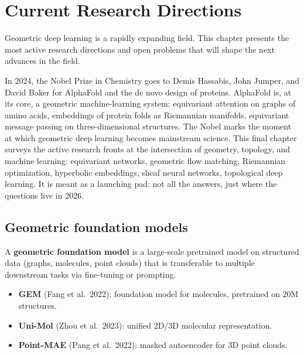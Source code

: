 \chapter{Current Research Directions}
\label{ch:research}

\begin{intuition}
Geometric deep learning is a rapidly expanding field. This chapter
presents the most active research directions and open problems that
will shape the next advances in the field.
\end{intuition}

In 2024, the Nobel Prize in Chemistry goes to Demis Hassabis, John Jumper, and David Baker for AlphaFold and the de novo design of proteins. AlphaFold is, at its core, a geometric machine-learning system: equivariant attention on graphs of amino acids, embeddings of protein folds as Riemannian manifolds, equivariant message passing on three-dimensional structures. The Nobel marks the moment at which geometric deep learning becomes mainstream science. This final chapter surveys the active research fronts at the intersection of geometry, topology, and machine learning: equivariant networks, geometric flow matching, Riemannian optimization, hyperbolic embeddings, sheaf neural networks, topological deep learning. It is meant as a launching pad: not all the answers, just where the questions live in 2026.

\section{Geometric foundation models}
\label{sec:foundation_models}

\begin{definition}
A \textbf{geometric foundation model} is a large-scale pretrained
model on structured data (graphs, molecules, point clouds) that is
transferable to multiple downstream tasks via fine-tuning or
prompting.
\end{definition}

\begin{example}
\begin{itemize}
  \item \textbf{GEM} (Fang et al.\ 2022): foundation model for
        molecules, pretrained on 20M structures.
  \item \textbf{Uni-Mol} (Zhou et al.\ 2023): unified 2D/3D
        molecular representation.
  \item \textbf{Point-MAE} (Pang et al.\ 2022): masked autoencoder
        for 3D point clouds.
\end{itemize}
\end{example}

